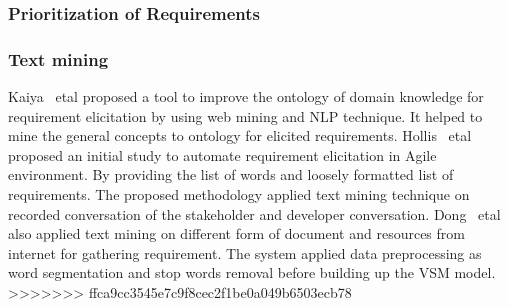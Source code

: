 \subsubsection{Prioritization of Requirements} 

\subsubsection{Text mining} 
 Kaiya ~etal \cite {Kaiya:2010} proposed a
tool to improve the ontology of domain knowledge for requirement elicitation by using web mining and NLP
technique. It helped to mine the general
concepts to ontology for elicited requirements.
Hollis ~etal               \cite{Hollis2017} proposed an initial study to
automate requirement elicitation in Agile environment. By providing the list of
words and loosely formatted list of requirements. The proposed methodology
applied text mining technique on recorded conversation of the stakeholder and
developer conversation. Dong ~etal \cite{dong2010}  also applied text mining on
different form of  document and resources from internet for  gathering
requirement. The system applied data preprocessing as word segmentation and stop
words removal before building up the VSM model. 
>>>>>>> ffca9cc3545e7c9f8cec2f1be0a049b6503ecb78
